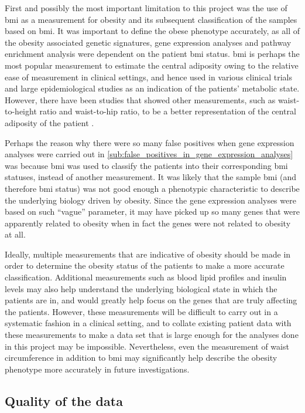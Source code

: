 First and possibly the most important limitation to this project was the use of \gls{bmi} as a measurement for obesity and its subsequent classification of the samples based on \gls{bmi}.
It was important to define the obese phenotype accurately, as all of the obesity associated genetic signatures, gene expression analyses and pathway enrichment analysis were dependent on the patient \gls{bmi} status.
\Gls{bmi} is perhaps the most popular measurement to estimate the central adiposity owing to the relative ease of measurement in clinical settings, and hence used in various clinical trials and large epidemiological studies as an indication of the patients' metabolic state.
However, there have been studies that showed other measurements, such as waist-to-height ratio and waist-to-hip ratio, to be a better representation of the central adiposity of the patient \citep{Dalton2003,Lee2008}.

Perhaps the reason why there were so many false positives when gene expression analyses were carried out in \cref{sub:false_positives_in_gene_expression_analyses} was because \gls{bmi} was used to classify the patients into their corresponding \gls{bmi} statuses, instead of another measurement.
It was likely that the sample \gls{bmi} (and therefore \gls{bmi} status) was not good enough a phenotypic characteristic to describe the underlying biology driven by obesity.
Since the gene expression analyses were based on such ``vague'' parameter, it may have picked up so many genes that were apparently related to obesity when in fact the genes were not related to obesity at all.

Ideally, multiple measurements that are indicative of obesity should be made in order to determine the obesity status of the patients to make a more accurate classification.
Additional measurements such as blood lipid profiles and insulin levels may also help understand the underlying biological state in which the patients are in, and would greatly help focus on the genes that are truly affecting the patients.
However, these measurements will be difficult to carry out in a systematic fashion in a clinical setting, and to collate existing patient data with these measurements to make a data set that is large enough for the analyses done in this project may be impossible.
Nevertheless, even the measurement of waist circumference in addition to \gls{bmi} may significantly help describe the obesity phenotype more accurately in future investigations.

\subsection{Quality of the data}
\label{sub:quality_of_the_data}

